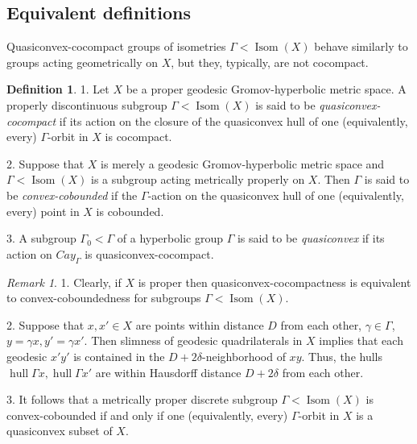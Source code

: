 \documentclass[12pt]{amsbook}%
\theoremstyle{definition}
\newtheorem{defi}[thm]{Definition}
\theoremstyle{remark}
\newtheorem{rem}[thm]{Remark}
\numberwithin{section}{chapter}
\numberwithin{subsection}{section}
\numberwithin{figure}{chapter}
\DeclareMathOperator{\Isom}{Isom}
\DeclareMathOperator{\hull}{hull}
\def\Ga{\Gamma}
\def\ga{\gamma}
\begin{document}
\subsection{Equivalent definitions}



Quasiconvex-cocompact groups of isometries $\Ga< \Isom(X)$ behave similarly to groups acting geometrically on $X$, but they, typically, are not cocompact. 

\begin{defi}
1. Let $X$ be a proper geodesic Gromov-hyperbolic metric space. A properly discontinuous subgroup $\Ga< \Isom(X)$ is said to be {\em quasiconvex-cocompact} if its action on the closure of the quasiconvex hull of one (equivalently, every) 
$\Ga$-orbit in $X$ is cocompact. 

2. Suppose that $X$ is merely a geodesic Gromov-hyperbolic metric space and 
$\Ga< \Isom(X)$ is a subgroup acting metrically properly on $X$. Then $\Ga$ is said to be {\em convex-cobounded} if 
the $\Ga$-action on the quasiconvex hull of one (equivalently, every) point in $X$ is cobounded. 

3. A subgroup $\Gamma_0< \Ga$ of a hyperbolic group $\Ga$ is said to be {\em quasiconvex} if its action on $Cay_\Ga$ is quasiconvex-cocompact.  
  
\end{defi}





\begin{rem}
1. Clearly, if $X$ is proper then quasiconvex-cocompactness is equivalent to convex-coboundedness for subgroups 
$\Ga< \Isom(X)$. 

2. Suppose that $x, x'\in X$ are points within distance $D$ from each other, $\ga\in \Ga$, $y=\ga x, y'=\ga x'$. 
Then slimness of geodesic quadrilaterals in $X$ implies that each geodesic $x'y'$ is contained in the $D+2\delta$-neighborhood of $xy$. Thus, the hulls $\hull \Ga x, \hull \Ga x'$ are within Hausdorff distance $D+2\delta$ from each other.

3. It follows that  a metrically proper discrete subgroup $\Ga<\Isom(X)$ is  
convex-cobounded if and only if one (equivalently, every) $\Ga$-orbit in $X$ is a quasiconvex subset of $X$.
\end{rem}
\end{document}
